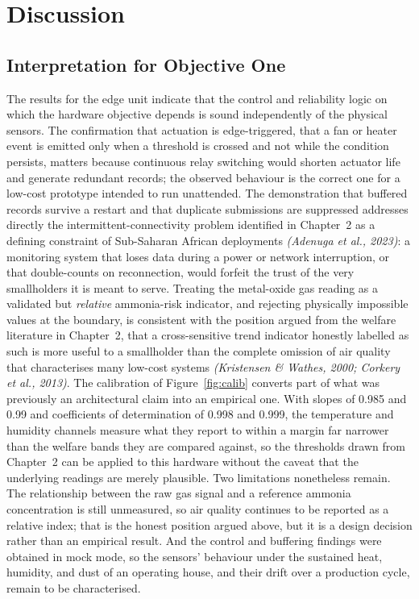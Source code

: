 \documentclass[12pt,a4paper]{report}
\begin{document}
\section{Discussion}

\subsection{Interpretation for Objective One}

The results for the edge unit indicate that the control and reliability logic on which the hardware objective depends is sound independently of the physical sensors. The confirmation that actuation is edge-triggered, that a fan or heater event is emitted only when a threshold is crossed and not while the condition persists, matters because continuous relay switching would shorten actuator life and generate redundant records; the observed behaviour is the correct one for a low-cost prototype intended to run unattended. The demonstration that buffered records survive a restart and that duplicate submissions are suppressed addresses directly the intermittent-connectivity problem identified in Chapter~2 as a defining constraint of Sub-Saharan African deployments \textit{(Adenuga et al., 2023)}: a monitoring system that loses data during a power or network interruption, or that double-counts on reconnection, would forfeit the trust of the very smallholders it is meant to serve. Treating the metal-oxide gas reading as a validated but \emph{relative} ammonia-risk indicator, and rejecting physically impossible values at the boundary, is consistent with the position argued from the welfare literature in Chapter~2, that a cross-sensitive trend indicator honestly labelled as such is more useful to a smallholder than the complete omission of air quality that characterises many low-cost systems \textit{(Kristensen \& Wathes, 2000; Corkery et al., 2013)}. The calibration of Figure~\ref{fig:calib} converts part of what was previously an architectural claim into an empirical one. With slopes of 0.985 and 0.99 and coefficients of determination of 0.998 and 0.999, the temperature and humidity channels measure what they report to within a margin far narrower than the welfare bands they are compared against, so the thresholds drawn from Chapter~2 can be applied to this hardware without the caveat that the underlying readings are merely plausible. Two limitations nonetheless remain. The relationship between the raw gas signal and a reference ammonia concentration is still unmeasured, so air quality continues to be reported as a relative index; that is the honest position argued above, but it is a design decision rather than an empirical result. And the control and buffering findings were obtained in mock mode, so the sensors' behaviour under the sustained heat, humidity, and dust of an operating house, and their drift over a production cycle, remain to be characterised.
\end{document}
